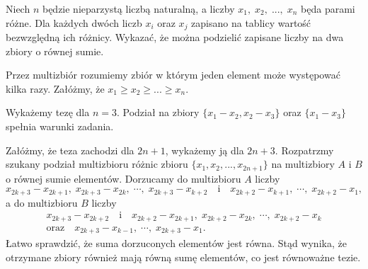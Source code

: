\begin{problem}{7}
Niech $n$ będzie nieparzystą liczbą naturalną, a liczby $x_1,\; x_2,\; ...,\; x_n$ będa parami różne. Dla każdych dwóch liczb $x_i$ oraz $x_j$ zapisano na tablicy wartość bezwzględną ich różnicy. Wykazać, że można podzielić zapisane liczby na dwa zbiory o równej sumie.
\end{problem}
\noindent
Przez multizbiór rozumiemy zbiór w którym jeden element może występować kilka razy.
Załóżmy, że $x_1 \geqslant x_2 \geqslant ... \geqslant x_n$. 
\vspace{10px}

\noindent
Wykażemy tezę dla $n = 3$. Podział na zbiory $\{x_1 - x_2, x_2 - x_3\}$ oraz $\{x_1 - x_3\}$ spełnia warunki zadania.
\vspace{10px}

\noindent
Załóżmy, że teza zachodzi dla $2n + 1$, wykażemy ją dla $2n + 3$.
Rozpatrzmy szukany podział multizbioru różnic zbioru $\{x_1, x_2, ..., x_{2n + 1}\}$ na multizbiory $A$ i $B$ o równej sumie elementów.
Dorzucamy do multizbioru $A$ liczby
\[
	{x_{2k+3}-x_{2k+1}, \; x_{2k+3}-x_{2k},\; \cdots, \; x_{2k+3}-x_{k+2}} \quad \text{i} \quad {x_{2k+2}-x_{k+1},\; \cdots, \; x_{2k+2}-x_1},
\]
a do multizbioru $B$ liczby
\begin{gather*}
	x_{2k+3} - x_{2k+2} \quad \text{i} \quad x_{2k+2} - x_{2k+1},\; x_{2k+2} - x_{2k},\; \cdots,\; x_{2k+2} - x_{k}  \\ \text{oraz} \quad {x_{2k+3} - x_{k-1},\; \cdots, \; x_{2k+3}-x_1}.
\end{gather*}
Łatwo sprawdzić, że suma dorzuconych elementów jest równa. Stąd wynika, że otrzymane zbiory również mają równą sumę elementów, co jest równoważne tezie.